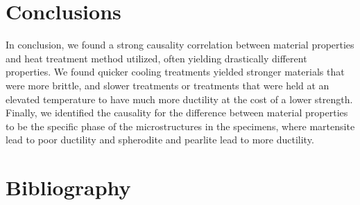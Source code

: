 \documentclass{article}
\begin{document}
\section{Conclusions}
In conclusion, we found a strong causality correlation between material properties and heat treatment method utilized, often yielding drastically different properties. We found quicker cooling treatments yielded stronger materials that were more brittle, and slower treatments or treatments that were held at an elevated temperature to have much more ductility at the cost of a lower strength. Finally, we identified the causality for the difference between material properties to be the specific phase of the microstructures in the specimens, where martensite lead to poor ductility and spherodite and pearlite lead to more ductility.

\section{Bibliography}
\printbibliography[heading=none]
\end{document}
